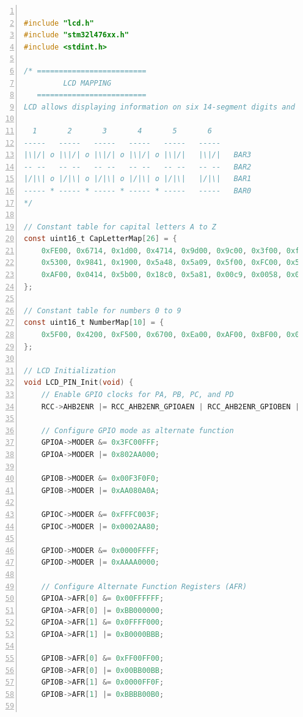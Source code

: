 \documentclass[12pt]{article}
\begin{document}
\begin{lstlisting}[language=C, caption={LCD Configuration and Display Code}, label={code:lcd_configuration}, basicstyle=\ttfamily\footnotesize, keywordstyle=\color{blue}, commentstyle=\color{gray}, stringstyle=\color{red}, breaklines=true, numbers=left, numberstyle=\tiny\color{gray}, frame=single]

#include "lcd.h"
#include "stm32l476xx.h"
#include <stdint.h>

/* =========================
         LCD MAPPING
   =========================
LCD allows displaying information on six 14-segment digits and 4 bars:

  1       2       3       4       5       6
-----   -----   -----   -----   -----   -----   
|\|/| o |\|/| o |\|/| o |\|/| o |\|/|   |\|/|   BAR3
-- --   -- --   -- --   -- --   -- --   -- --   BAR2
|/|\| o |/|\| o |/|\| o |/|\| o |/|\|   |/|\|   BAR1
----- * ----- * ----- * ----- * -----   -----   BAR0
*/

// Constant table for capital letters A to Z
const uint16_t CapLetterMap[26] = {
    0xFE00, 0x6714, 0x1d00, 0x4714, 0x9d00, 0x9c00, 0x3f00, 0xfa00, 0x0014,
    0x5300, 0x9841, 0x1900, 0x5a48, 0x5a09, 0x5f00, 0xFC00, 0x5F01, 0xFC01,
    0xAF00, 0x0414, 0x5b00, 0x18c0, 0x5a81, 0x00c9, 0x0058, 0x05c0
};

// Constant table for numbers 0 to 9
const uint16_t NumberMap[10] = {
    0x5F00, 0x4200, 0xF500, 0x6700, 0xEa00, 0xAF00, 0xBF00, 0x04600, 0xFF00, 0xEF00
};

// LCD Initialization
void LCD_PIN_Init(void) {
    // Enable GPIO clocks for PA, PB, PC, and PD
    RCC->AHB2ENR |= RCC_AHB2ENR_GPIOAEN | RCC_AHB2ENR_GPIOBEN | RCC_AHB2ENR_GPIOCEN | RCC_AHB2ENR_GPIODEN;

    // Configure GPIO mode as alternate function
    GPIOA->MODER &= 0x3FC00FFF;
    GPIOA->MODER |= 0x802AA000;

    GPIOB->MODER &= 0x00F3F0F0;
    GPIOB->MODER |= 0xAA080A0A;

    GPIOC->MODER &= 0xFFFC003F;
    GPIOC->MODER |= 0x0002AA80;

    GPIOD->MODER &= 0x0000FFFF;
    GPIOD->MODER |= 0xAAAA0000;

    // Configure Alternate Function Registers (AFR)
    GPIOA->AFR[0] &= 0x00FFFFFF;
    GPIOA->AFR[0] |= 0xBB000000;
    GPIOA->AFR[1] &= 0x0FFFF000;
    GPIOA->AFR[1] |= 0xB0000BBB;

    GPIOB->AFR[0] &= 0xFF00FF00;
    GPIOB->AFR[0] |= 0x00BB00BB;
    GPIOB->AFR[1] &= 0x0000FF0F;
    GPIOB->AFR[1] |= 0xBBBB00B0;


\end{lstlisting}
\end{document}
